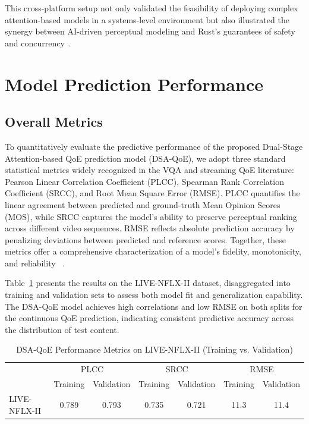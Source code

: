 This cross-platform setup not only validated the feasibility of deploying complex attention-based models in a systems-level environment but also illustrated the synergy between AI-driven perceptual modeling and Rust's guarantees of safety and concurrency~\cite{fulton2022benefits,carnelos2025microflow}.

\section{Model Prediction Performance}

\subsection{Overall Metrics}
\label{sec:overall_metrics}

To quantitatively evaluate the predictive performance of the proposed Dual-Stage Attention-based QoE prediction model (DSA-QoE), 
we adopt three standard statistical metrics widely recognized in the VQA and streaming QoE literature: Pearson Linear Correlation Coefficient (PLCC), 
Spearman Rank Correlation Coefficient (SRCC), and Root Mean Square Error (RMSE). PLCC quantifies the linear agreement between predicted and ground-truth 
Mean Opinion Scores (MOS), while SRCC captures the model's ability to preserve perceptual ranking across different video sequences. RMSE reflects absolute 
prediction accuracy by penalizing deviations between predicted and reference scores. Together, these metrics offer a comprehensive characterization of a model's fidelity, 
monotonicity, and reliability ~\cite{sheikh2006statistical, mittal2012vbed}.

Table~\ref{tab:overall_metrics} presents the results on the LIVE-NFLX-II dataset, disaggregated into training and validation sets to assess both model fit and 
generalization capability. The DSA-QoE model achieves high correlations and low RMSE on both splits for the continuous QoE prediction, indicating consistent predictive accuracy 
across the distribution of test content.

\begin{table}[h]
    \centering
    \caption{DSA-QoE Performance Metrics on LIVE-NFLX-II (Training vs. Validation)}
    \label{tab:overall_metrics}
    \begin{tabular}{lcccccc}
        \toprule
        & \multicolumn{2}{c}{PLCC} & \multicolumn{2}{c}{SRCC} & \multicolumn{2}{c}{RMSE} \\
        \cmidrule(lr){2-3} \cmidrule(lr){4-5} \cmidrule(lr){6-7}
        & Training & Validation & Training & Validation & Training & Validation \\
        \midrule
        LIVE-NFLX-II & 0.789 & 0.793 & 0.735 & 0.721 & 11.3 & 11.4 \\
        \bottomrule
    \end{tabular}
\end{table}

